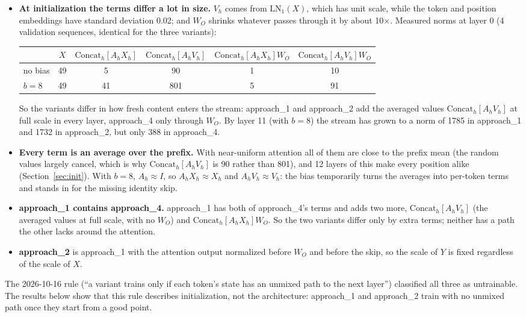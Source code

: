 \documentclass[11pt]{article}
\newcommand{\cat}{\mathrm{Concat}_h}
\newcommand{\aone}{approach\_1}
\newcommand{\atwo}{approach\_2}
\newcommand{\afour}{approach\_4}
\begin{document}
\begin{itemize}
\item \textbf{At initialization the terms differ a lot in size.} $V_h$ comes from $\mathrm{LN}_1(X)$, which has
unit scale, while the token and position embeddings have standard deviation 0.02; and $W_O$ shrinks whatever passes
through it by about 10$\times$. Measured norms at layer 0 (4 validation sequences, identical for the three
variants):
\begin{center}\footnotesize
\begin{tabular}{lccccc}
\toprule
 & $X$ & $\cat[A_hX_h]$ & $\cat[A_hV_h]$ & $\cat[A_hX_h]W_O$ & $\cat[A_hV_h]W_O$ \\
\midrule
no bias & 49 & 5 & 90 & 1 & 10 \\
$b = 8$ & 49 & 41 & 801 & 5 & 91 \\
\bottomrule
\end{tabular}
\end{center}
So the variants differ in how fresh content enters the stream: \aone{} and \atwo{} add the averaged values
$\cat[A_hV_h]$ at full scale in every layer, \afour{} only through $W_O$. By layer 11 (with $b = 8$) the stream has
grown to a norm of 1785 in \aone{} and 1732 in \atwo{}, but only 388 in \afour{}.
\item \textbf{Every term is an average over the prefix.} With near-uniform attention all of them are close to the
prefix mean (the random values largely cancel, which is why $\cat[A_hV_h]$ is 90 rather than 801), and 12 layers
of this make every position alike (Section~\ref{sec:init}). With $b = 8$, $A_h \approx I$, so
$A_hX_h \approx X_h$ and $A_hV_h \approx V_h$: the bias temporarily turns the averages into per-token terms and
stands in for the missing identity skip.
\item \textbf{\aone{} contains \afour{}.} \aone{} has both of \afour{}'s terms and adds two more, $\cat[A_hV_h]$
(the averaged values at full scale, with no $W_O$) and $\cat[A_hX_h]W_O$. So the two variants differ only by
extra terms; neither has a path the other lacks around the attention.
\item \textbf{\atwo{}} is \aone{} with the attention output normalized before $W_O$ and before the skip, so the
scale of $Y$ is fixed regardless of the scale of $X$.
\end{itemize}
The 2026-10-16 rule (``a variant trains only if each token's state has an unmixed path to the next layer'')
classified all three as untrainable. The results below show that this rule describes initialization, not the
architecture: \aone{} and \atwo{} train with no unmixed path once they start from a good point.
\end{document}
